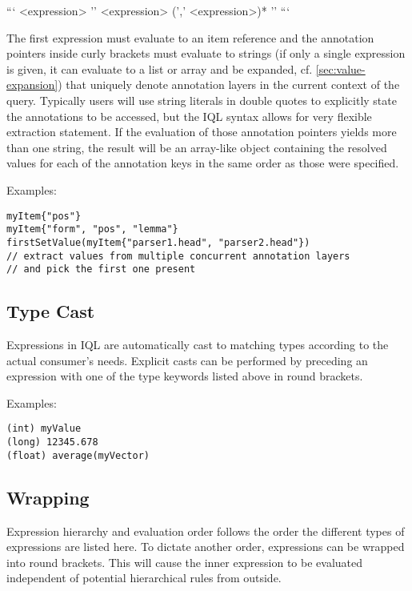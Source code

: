 \documentclass[11pt]{article}
\begin{document}
```
<expression> '{' <expression> (',' <expression>)* '}'
```

The first expression must evaluate to an item reference and the annotation pointers inside curly brackets must evaluate to strings (if only a single expression is given, it can evaluate to a list or array and be expanded, cf. \cref{sec:value-expansion}) that uniquely denote annotation layers in the current context of the query. Typically users will use string literals in double quotes to explicitly state the annotations to be accessed, but the IQL syntax allows for very flexible extraction statement. If the evaluation of those annotation pointers yields more than one string, the result will be an array-like object containing the resolved values for each of the annotation keys in the same order as those were specified.

Examples:

\begin{verbatim}
myItem{"pos"}
myItem{"form", "pos", "lemma"}
firstSetValue(myItem{"parser1.head", "parser2.head"})   
// extract values from multiple concurrent annotation layers
// and pick the first one present
\end{verbatim}

\subsection{Type Cast}
\label{sec:type-cast}

Expressions in IQL are automatically cast to matching types according to the actual consumer's needs. Explicit casts can be performed by preceding an expression with one of the type keywords listed above in round brackets.

Examples:

\begin{verbatim}
(int) myValue
(long) 12345.678
(float) average(myVector)
\end{verbatim}

\subsection{Wrapping}
\label{sec:wrapping}

Expression hierarchy and evaluation order follows the order the different types of expressions are listed here. To dictate another order, expressions can be wrapped into round brackets. This will cause the inner expression to be evaluated independent of potential hierarchical rules from outside.
\end{document}
